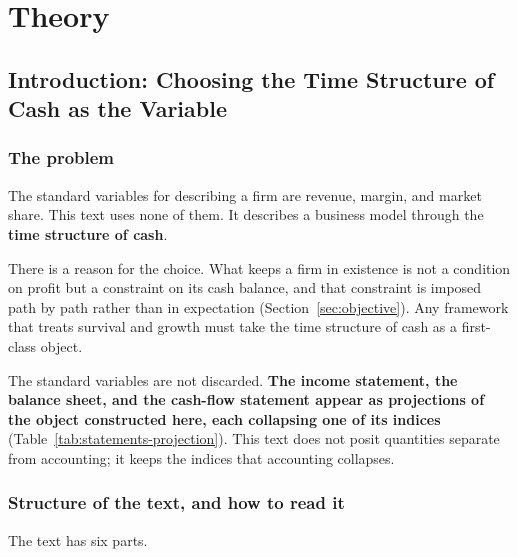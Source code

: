 \part{Theory}\label{part:theory}

\chapter{Introduction: Choosing the Time Structure of Cash as the Variable}

\section{The problem}

The standard variables for describing a firm are revenue, margin, and market share.
This text uses none of them. It describes a business model through the
\textbf{time structure of cash}.

There is a reason for the choice. What keeps a firm in existence is not a condition on
profit but a constraint on its cash balance, and that constraint is imposed path by path
rather than in expectation (Section~\ref{sec:objective}). Any framework that treats
survival and growth must take the time structure of cash as a first-class object.

The standard variables are not discarded.
\textbf{The income statement, the balance sheet, and the cash-flow statement appear as
projections of the object constructed here, each collapsing one of its indices}
(Table~\ref{tab:statements-projection}). This text does not posit quantities separate
from accounting; it keeps the indices that accounting collapses.

\section{Structure of the text, and how to read it}

The text has six parts.

